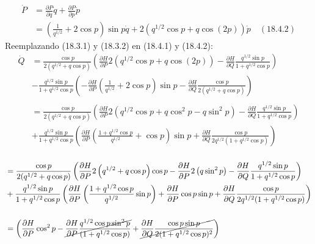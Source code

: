 \documentclass[a4paper]{article}
\begin{document}
\begin{answer}[Punto 4]
\begin{itemize}
            \begin{align*}
                \dot P &= \frac{\partial P}{\partial q} \dot q + \frac{\partial P}{\partial p} \dot p\\
                &= \left(\frac1{q^{1/2}} + 2\cos p\right)\sin p \dot q + 2 \left( q^{1/2} \cos p + q \cos (2p) \right) \dot p \quad (18.4.2) 
            \end{align*}
            Reemplazando (18.3.1) y (18.3.2) en (18.4.1) y (18.4.2):
            \begin{align*}
                \dot Q &= \frac{\cos p}{2(q^{1/2}  + q \cos p)} \left( \frac{\partial H}{\partial P} 2 \left( q^{1/2} \cos p + q \cos (2p) \right) - \frac{\partial H}{\partial Q} \frac{q^{1/2} \sin p}{1 + q^{1/2} \cos p} \right)\\
                &-\frac{q^{1/2} \sin p}{1 + q^{1/2} \cos p} \left( -\frac{\partial H}{\partial P} \left(\frac1{q^{1/2}} + 2\cos p\right)\sin p - \frac{\partial H}{\partial Q} \frac{\cos p}{2(q^{1/2}  + q \cos p)} \right)\\\\
                &= \frac{\cos p}{2(q^{1/2}  + q \cos p)} \left( \frac{\partial H}{\partial P} 2 \left( q^{1/2} \cos p + q \cos^2 p - q \sin^2 p \right) - \frac{\partial H}{\partial Q} \frac{q^{1/2} \sin p}{1 + q^{1/2} \cos p} \right)\\
                &+ \frac{q^{1/2} \sin p}{1 + q^{1/2} \cos p} \left(\frac{\partial H}{\partial P} \left(\frac{1 + q^{1/2}\cos p}{q^{1/2}} + \cos p\right)\sin p + \frac{\partial H}{\partial Q} \frac{\cos p}{2q^{1/2}(1  + q^{1/2} \cos p)} \right)\\\\
            \end{align*}
            \begin{align*}
                &= \frac{\cos p}{2(q^{1/2}  + q \cos p)} \left( \frac{\partial H}{\partial P} 2 \left( q^{1/2}  + q \cos p\right)\cos p - \frac{\partial H}{\partial P} 2\left( q \sin^2 p \right) - \frac{\partial H}{\partial Q} \frac{q^{1/2} \sin p}{1 + q^{1/2} \cos p} \right)\\
                &+ \frac{q^{1/2} \sin p}{1 + q^{1/2} \cos p} \left(\frac{\partial H}{\partial P} \left(\frac{1 + q^{1/2}\cos p}{q^{1/2}} \sin p \right) + \frac{\partial H}{\partial P} \cos p\sin p + \frac{\partial H}{\partial Q} \frac{\cos p}{2q^{1/2}(1  + q^{1/2} \cos p)} \right)\\\\
                &=  \left( \frac{\partial H}{\partial P} \cos^2 p - \cancel{\frac{\partial H}{\partial P} \frac{q^{1/2}\cos p\sin^2 p }{(1  + q^{1/2}\cos p)}} +\cancel{\frac{\partial H}{\partial Q} \frac{\cos p \sin p}{2(1 + q^{1/2} \cos p)^2}} \right)\\

\end{align*}
\end{itemize}
\end{answer}
\end{document}

